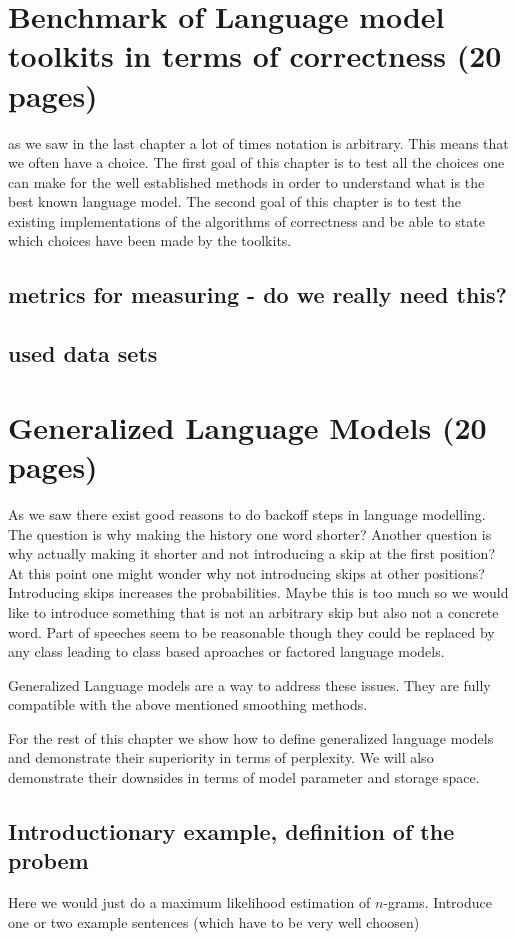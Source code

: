 \chapter{Benchmark of Language model toolkits in terms of correctness (20 pages)}
as we saw in the last chapter a lot of times notation is arbitrary.
This means that we often have a choice. 
The first goal of this chapter is to test all the choices one can make for the well established methods in order to understand what is the best known language model. 
The second goal of this chapter is to test the existing implementations of the algorithms of correctness and be able to state which choices have been made by the toolkits.
\section{metrics for measuring - do we really need this?}
\section{used data sets}


\chapter{Generalized Language Models (20 pages)}
As we saw there exist good reasons to do backoff steps in language modelling. 
The question is why making the history one word shorter?
Another question is why actually making it shorter and not introducing a skip at the first position?
At this point one might wonder why not introducing skips at other positions? 
Introducing skips increases the probabilities. 
Maybe this is too much so we would like to introduce something that is not an arbitrary skip but also not a concrete word. Part of speeches seem to be reasonable though they could be replaced by any class leading to class based aproaches\cite{CLASS:BASED:LMS} or factored language models\cite{FACTORED:LANGUAGE:MODEL}.

Generalized Language models are a way to address these issues. 
They are fully compatible with the above mentioned smoothing methods. 

For the rest of this chapter we show how to define generalized language models and demonstrate their superiority in terms of perplexity. 
We will also demonstrate their downsides in terms of model parameter and storage space.


\section{Introductionary example, definition of the probem}
Here we would just do a maximum likelihood estimation of $n$-grams. 
Introduce one or two example sentences (which have to be very well choosen)
